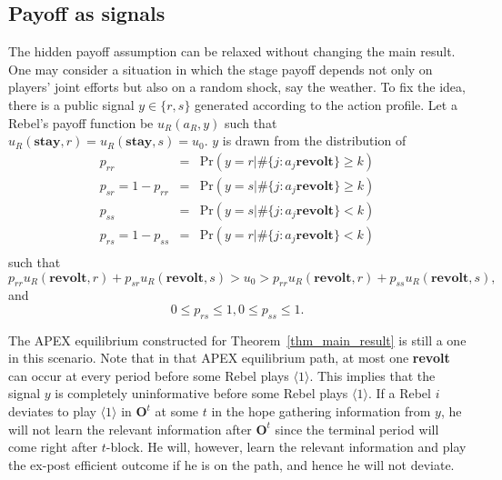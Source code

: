 \documentclass[12pt,letter]{article}
\newcommand{\Omicron}{\mathbf{O}}
\theoremstyle{definition}
\theoremstyle{remark}
\theoremstyle{claim}
\begin{document}
\subsection{Payoff as signals}
The hidden payoff assumption can be relaxed without changing the main result. One may consider a situation in which the stage payoff depends not only on players' joint efforts but also on a random shock, say the weather. To fix the idea, there is a public signal $y\in \{r,s\}$ generated according to the action profile. Let a Rebel's payoff function be $u_{R}(a_{R},y)$ such that $u_{R}(\textbf{stay},r)=u_{R}(\textbf{stay},s)=u_0$. $y$ is drawn from the distribution of 
\begin{eqnarray*}
p_{rr} &=& \mathrm {Pr}(y=r|\#\{j:a_j\textbf{revolt}\}\geq k) \\
p_{sr}=1-p_{rr} &=& \mathrm {Pr}(y=s|\#\{j:a_j\textbf{revolt}\}\geq k) \\
p_{ss} &=& \mathrm {Pr}(y=s|\#\{j:a_j\textbf{revolt}\}< k) \\
p_{rs}=1-p_{ss} &=& \mathrm {Pr}(y=r|\#\{j:a_j\textbf{revolt}\}< k) \\
\end{eqnarray*}
such that
\begin{equation*}
p_{rr}u_{R}(\textbf{revolt}, r)+p_{sr}u_{R}(\textbf{revolt}, s)>u_0>p_{rr}u_{R}(\textbf{revolt}, r)+p_{ss}u_{R}(\textbf{revolt}, s),
\end{equation*}
and
\begin{equation*}
0\leq p_{rs}\leq 1,0\leq p_{ss}\leq 1.
\end{equation*}

The APEX equilibrium constructed for Theorem~\ref{thm_main_result} is still a one in this scenario. Note that in that APEX equilibrium path, at most one \textbf{revolt} can occur at every period before some Rebel plays $\langle 1 \rangle$. This implies that the signal $y$ is completely uninformative before some Rebel plays $\langle 1 \rangle$. If a Rebel $i$ deviates to play $\langle 1 \rangle$ in $\Omicron^t$ at some $t$ in the hope gathering information from $y$, he will not learn the relevant information after $\Omicron^t$ since the terminal period will come right after $t$-block. He will, however, learn the relevant information and play the ex-post efficient outcome if he is on the path, and hence he will not deviate.

\end{document}
